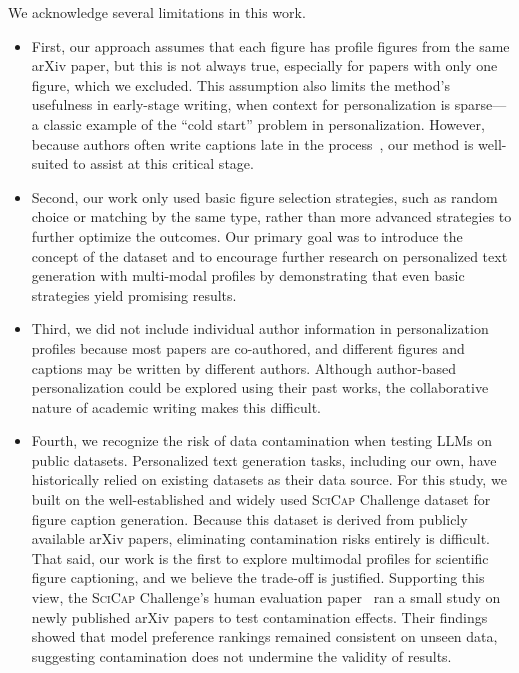 We acknowledge several limitations in this work.

\begin{itemize}

\item 
First, our approach assumes that each figure has profile figures from the same arXiv paper, but this is not always true, especially for papers with only one figure, which we excluded.
This assumption also limits the method's usefulness in early-stage writing, when context for personalization is sparse---a classic example of the ``cold start'' problem in personalization.
However, because authors often write captions late in the process~\cite{ng2025understanding}, our method is well-suited to assist at this critical stage.



\item 
Second, our work only used basic figure selection strategies, such as random choice or matching by the same type, rather than more advanced strategies to further optimize the outcomes.
Our primary goal was to introduce the concept of the dataset and to encourage further research on personalized text generation with multi-modal profiles by demonstrating that even basic strategies yield promising results.

\item 
Third, we did not include individual author information in personalization profiles because most papers are co-authored, and different figures and captions may be written by different authors.
Although author-based personalization could be explored using their past works, the collaborative nature of academic writing makes this difficult.

\item 
Fourth, we recognize the risk of data contamination when testing LLMs on public datasets. 
Personalized text generation tasks, including our own, have historically relied on existing datasets as their data source. 
For this study, we built \dataset on the well-established and widely used \textsc{SciCap} Challenge dataset for figure caption generation. 
Because this dataset is derived from publicly available arXiv papers, eliminating contamination risks entirely is difficult.
That said, our work is the first to explore multimodal profiles for scientific figure captioning, and we believe the trade-off is justified. 
Supporting this view, the \textsc{SciCap} Challenge's human evaluation paper~\cite{hsu2025large} ran a small study on newly published arXiv papers to test contamination effects. 
Their findings showed that model preference rankings remained consistent on unseen data, suggesting contamination does not undermine the validity of results.



\end{itemize}
